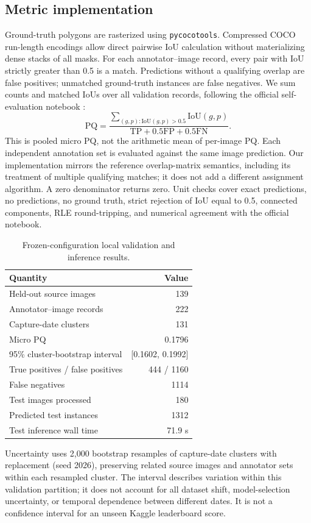 \documentclass[sigconf]{acmart}
\begin{document}
\subsection{Metric implementation}
Ground-truth polygons are rasterized using \texttt{pycocotools}. Compressed COCO run-length encodings allow direct pairwise IoU calculation without materializing dense stacks of all masks. For each annotator--image record, every pair with IoU strictly greater than 0.5 is a match. Predictions without a qualifying overlap are false positives; unmatched ground-truth instances are false negatives. We sum counts and matched IoUs over all validation records, following the official self-evaluation notebook \cite{evaluation}:
\begin{equation}
\mathrm{PQ}=\frac{\sum_{(g,p):\mathrm{IoU}(g,p)>0.5}\mathrm{IoU}(g,p)}{\mathrm{TP}+0.5\mathrm{FP}+0.5\mathrm{FN}}.
\end{equation}
This is pooled micro PQ, not the arithmetic mean of per-image PQ. Each independent annotation set is evaluated against the same image prediction. Our implementation mirrors the reference overlap-matrix semantics, including its treatment of multiple qualifying matches; it does not add a different assignment algorithm. A zero denominator returns zero. Unit checks cover exact predictions, no predictions, no ground truth, strict rejection of IoU equal to 0.5, connected components, RLE round-tripping, and numerical agreement with the official notebook.

\begin{table}[h]
\caption{Frozen-configuration local validation and inference results.}
\centering\begin{tabular}{lr}\toprule
Quantity & Value\\\midrule
Held-out source images & 139\\
Annotator--image records & 222\\
Capture-date clusters & 131\\
Micro PQ & 0.1796\\
95\% cluster-bootstrap interval & [0.1602, 0.1992]\\
True positives / false positives & 444 / 1160\\
False negatives & 1114\\
Test images processed & 180\\
Predicted test instances & 1312\\
Test inference wall time & 71.9 s\\\bottomrule
\end{tabular}
\end{table}
Uncertainty uses 2,000 bootstrap resamples of capture-date clusters with replacement (seed 2026), preserving related source images and annotator sets within each resampled cluster. The interval describes variation within this validation partition; it does not account for all dataset shift, model-selection uncertainty, or temporal dependence between different dates. It is not a confidence interval for an unseen Kaggle leaderboard score.
\end{document}
